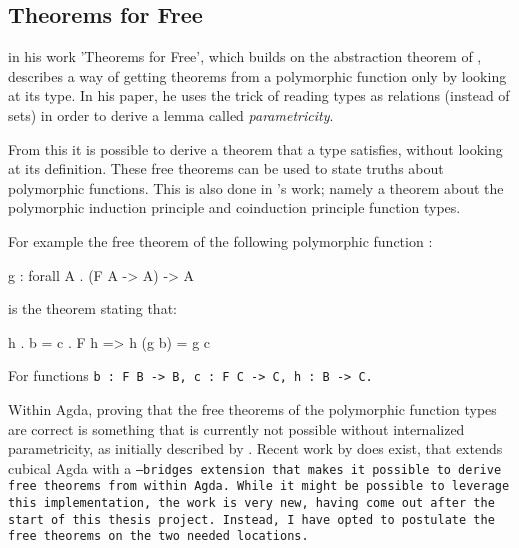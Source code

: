 
\subsection{Theorems for Free}\label{sec:free}
\cite{Wadler1989} in his work 'Theorems for Free', which builds on the abstraction theorem of \cite{Reynolds1983}, describes a way of getting theorems from a polymorphic function only by looking at its type.
In his paper, he uses the trick of reading types as relations (instead of sets) in order to derive a lemma called \textit{parametricity}.

From this it is possible to derive a theorem that a type satisfies, without looking at its definition.
These free theorems can be used to state truths about polymorphic functions.
This is also done in \cite{Harper2011}'s work; namely a theorem about the polymorphic induction principle and coinduction principle function types.

For example the free theorem of the following polymorphic function \citep{Harper2011}:
\begin{code}
g : forall A . (F A -> A) -> A
\end{code}
is the theorem stating that:
\begin{code}
h . b = c . F h => h (g b) = g c
\end{code}
For functions \tt{b : F B -> B}, \tt{c : F C -> C}, \tt{h : B -> C}.


Within Agda, proving that the free theorems of the polymorphic function types are correct is something that is currently not possible without internalized parametricity, as initially described by \cite{Bernardy2012}.
Recent work by \cite{Muylder2024} does exist, that extends cubical Agda with a \tt{--bridges} extension that makes it possible to derive free theorems from within Agda.
While it might be possible to leverage this implementation, the work is very new, having come out after the start of this thesis project.
Instead, I have opted to postulate the free theorems on the two needed locations.